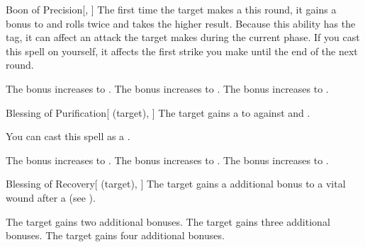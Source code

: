 \lowercase{\hypertarget{spell:Boon of Precision}{}}\label{spell:Boon of Precision}
\begin{freeability}[Rank 1]{\hypertarget{spell:Boon of Precision}{Boon of Precision}}[, ]
The first time the target makes a  this round,
it gains a  bonus to  and rolls twice and takes the higher result.
Because this ability has the  tag, it can affect an attack the target makes during the current phase.
If you cast this spell on yourself, it affects the first strike you make until the end of the next round.

\rankline
{} The bonus increases to .
 The bonus increases to .
 The bonus increases to .
\end{freeability}
\vspace{0.25em}



\lowercase{\hypertarget{spell:Blessing of Purification}{}}\label{spell:Blessing of Purification}
\begin{attuneability}[Rank 2]{\hypertarget{spell:Blessing of Purification}{Blessing of Purification}}[ (target), ]
The target gains a   to  against  and .

You can cast this spell as a .

\rankline
{} The bonus increases to .
 The bonus increases to .
 The bonus increases to .
\end{attuneability}
\vspace{0.25em}



\lowercase{\hypertarget{spell:Blessing of Recovery}{}}\label{spell:Blessing of Recovery}
\begin{attuneability}[Rank 2]{\hypertarget{spell:Blessing of Recovery}{Blessing of Recovery}}[ (target), ]
The target gains a additional  bonus to a vital wound after a  (see ).

\rankline
{} The target gains two additional  bonuses.
 The target gains three additional  bonuses.
 The target gains four additional  bonuses.
\end{attuneability}
\vspace{0.25em}



